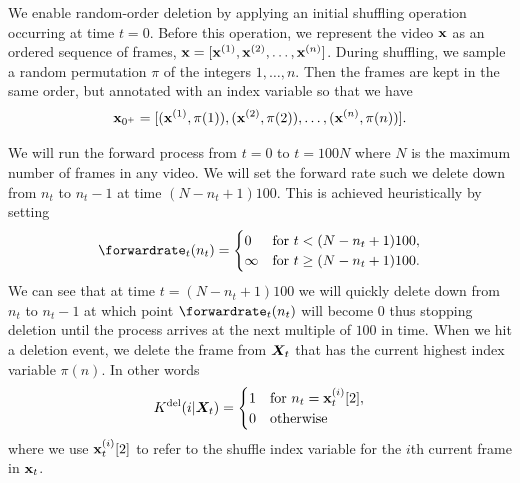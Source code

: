 We enable random-order deletion by applying an initial shuffling operation occurring at time $t=0$. Before this operation, we represent the video ${\mathbf{x}}$ as an ordered sequence of frames, ${\mathbf{x}}=[{\mathbf{x}}^{(1)},{\mathbf{x}}^{(2)},\ldots,{\mathbf{x}}^{(n)}]$. During shuffling, we sample a random permutation $\pi$ of the integers $1,\ldots,n$. Then the frames are kept in the same order, but annotated with an index variable so that we have 
\begin{equation}
    {\mathbf{x}}_{0^+}=[({\mathbf{x}}^{(1)}, \pi(1)), ({\mathbf{x}}^{(2)}, \pi(2)), \ldots, ({\mathbf{x}}^{(n)}, \pi(n))].
\end{equation}

We will run the forward process from $t=0$ to $t = 100N$ where $N$ is the maximum number of frames in any video. We will set the forward rate such we delete down from $n_t$ to $n_t - 1$ at time $(N-n_t+1)100$. This is achieved heuristically by setting
\begin{equation}
    \forwardrate_t(n_t) = \begin{cases}
        0 & \text{for } t < (N-n_t+1)100, \\
        \infty & \text{for }  t \geq (N-n_t + 1) 100.
    \end{cases} 
\end{equation}
We can see that at time $t = (N - n_t + 1)100$ we will quickly delete down from $n_t$ to $n_t-1$ at which point $\forwardrate_t(n_t)$ will become $0$ thus stopping deletion until the process arrives at the next multiple of $100$ in time. When we hit a deletion event, we delete the frame from ${\bm{X}}_t$ that has the current highest index variable $\pi(n)$. In other words
\begin{equation}
    K^{\textup{del}}(i | {\bm{X}}_t) = \begin{cases}
        1 & \text{for } n_t = {\mathbf{x}}_{t}^{(i)}[2], \\
        0 & \text{otherwise}
    \end{cases}    
\end{equation}
where we use ${\mathbf{x}}_{t}^{(i)}[2]$ to refer to the shuffle index variable for the $i$th current frame in ${\mathbf{x}}_{t}$.


